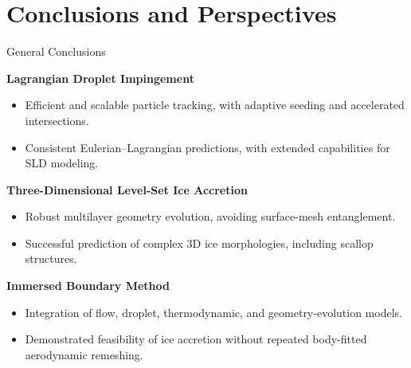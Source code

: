 \section[Conclusions]{Conclusions and Perspectives}



\begin{frame}{General Conclusions}

\vspace{0.15cm}

{\color{champsBlue}\bfseries
Lagrangian Droplet Impingement}

\vspace{0.10cm}

\begin{itemize}
    \item Efficient and scalable particle tracking,
    with adaptive seeding and accelerated intersections.
    \item Consistent Eulerian--Lagrangian predictions,
    with extended capabilities for SLD modeling.
\end{itemize}

\vspace{0.22cm}

{\color{champsBlue}\bfseries
Three-Dimensional Level-Set Ice Accretion}

\vspace{0.10cm}

\begin{itemize}
    \item Robust multilayer geometry evolution,
    avoiding surface-mesh entanglement.
    \item Successful prediction of complex 3D ice
    morphologies, including scallop structures.
\end{itemize}

\vspace{0.22cm}

{\color{champsBlue}\bfseries
Immersed Boundary Method}

\vspace{0.10cm}

\begin{itemize}
    \item Integration of flow, droplet, thermodynamic,
    and geometry-evolution models.
    \item Demonstrated feasibility of ice accretion
    without repeated body-fitted aerodynamic remeshing.
\end{itemize}

\vfill

\begin{center}
\end{center}

\end{frame}

